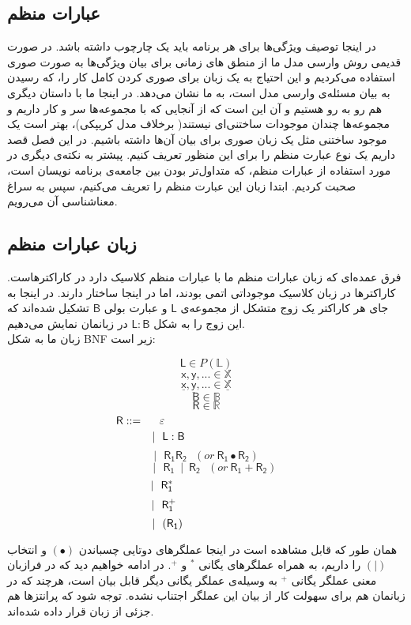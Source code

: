 \subsection{عبارات منظم}
در اینجا توصیف ویژگی‌ها برای هر برنامه باید یک چارچوب داشته باشد. در صورت قدیمی روش وارسی مدل ما از منطق های زمانی برای بیان ویژگی‌ها به صورت صوری استفاده می‌کردیم و این احتیاج به یک زبان برای صوری کردن کامل کار را، که رسیدن به بیان مسئله‌ی وارسی مدل است، به ما نشان می‌دهد. در اینجا ما با داستان دیگری هم رو به رو هستیم و آن این است که از آنجایی که با مجموعه‌ها سر و کار داریم و مجموعه‌ها چندان موجودات ساختنی‌ای نیستند( برخلاف مدل کریپکی)، بهتر است یک موجود ساختنی مثل یک زبان صوری برای بیان آن‌ها داشته باشیم. در این فصل قصد داریم یک نوع عبارت منظم را برای این منظور تعریف کنیم. پیشتر به نکته‌ی دیگری در مورد استفاده از عبارات منظم، که متداول‌تر بودن بین جامعه‌ی برنامه نویسان است، صحبت کردیم. ابتدا زبان این عبارت منظم را تعریف می‌کنیم، سپس به سراغ معناشناسی آن می‌رویم. 
\subsection{زبان عبارات منظم}
فرق عمده‌ای که زبان عبارات منظم ما با عبارات منظم کلاسیک دارد در کاراکترهاست. کاراکترها در زبان کلاسیک موجوداتی اتمی بودند، اما در اینجا ساختار دارند. در اینجا به جای هر کاراکتر یک زوج متشکل از مجموعه‌ی $\mathsf{L}$ و عبارت بولی $\mathsf{B}$ تشکیل شده‌اند که این زوج را به شکل 
$\mathsf{L : B}$
در زبانمان نمایش می‌دهیم.\\ 
زبان ما به شکل BNF زیر است:
\begin{defn}
$$\mathsf{L} \in \mathit{P}(\mathbb{L})$$        
$$\mathsf{x,y,...} \in \mathbb{X}$$
$$\mathsf{\underline{x},\underline{y},...} \in \mathbb{\underline{X}}$$
$$\mathsf{B} \in \mathbb{B}$$
$$\mathsf{R} \in \mathbb{R}$$
\newpage
$$\mathsf{R} ::=\hspace{0.5cm} \varepsilon\hspace{4.2cm}$$
$$|\:\:\:\mathsf{L : B}\hspace{2.4cm}$$
$$|\:\:\:\mathsf{R_1 R_2}\:\:\:(or\:\mathsf{R_1 \bullet R_2 })$$
$$\:\:\:\:\:\:\:|\:\:\:\mathsf{R_1\:\mid\:R_2}\:\:\:(or\:\mathsf{R_1 + R_2 })$$
$$|\:\:\:\mathsf{R_1^*}\hspace{2.8cm}$$
$$|\:\:\:\mathsf{R_1^+}\hspace{2.7cm}$$
$$|\:\:\:(\mathsf{R_1})\hspace{2.47cm}$$
\end{defn}
همان طور که قابل مشاهده است در اینجا عملگرهای دوتایی چسباندن
$(\bullet)$
 و انتخاب
$(|)$
 را داریم، به همراه عملگرهای یگانی 
$^*$
و
$^+$.
در ادامه خواهیم دید که در فرازبان معنی عملگر یگانی 
$^+$
به وسیله‌ی عملگر یگانی دیگر قابل بیان است، هرچند که در زبانمان هم برای سهولت کار از بیان این عملگر اجتناب نشده. 
توجه شود که پرانتزها هم جزئی از زبان قرار داده شده‌اند.


